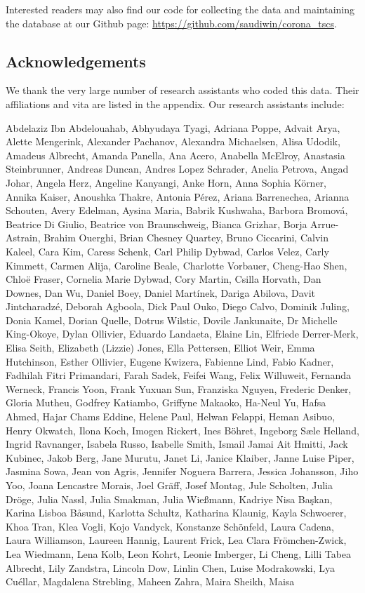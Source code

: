 \documentclass[]{article}
\begin{document}
Interested readers may also find our code for collecting the data and maintaining the database at our Github page: \url{https://github.com/saudiwin/corona_tscs}.

\hypertarget{acknowledgements}{%
\subsection*{Acknowledgements}\label{acknowledgements}}

We thank the very large number of research assistants who coded this data. Their affiliations and vita are listed in the appendix. Our research assistants include:

Abdelaziz Ibn Abdelouahab, Abhyudaya Tyagi, Adriana Poppe, Advait Arya, Alette Mengerink, Alexander Pachanov, Alexandra Michaelsen, Alisa Udodik, Amadeus Albrecht, Amanda Panella, Ana Acero, Anabella McElroy, Anastasia Steinbrunner, Andreas Duncan, Andres Lopez Schrader, Anelia Petrova, Angad Johar, Angela Herz, Angeline Kanyangi, Anke Horn, Anna Sophia Körner, Annika Kaiser, Anoushka Thakre, Antonia Pérez, Ariana Barrenechea, Arianna Schouten, Avery Edelman, Aysina Maria, Babrik Kushwaha, Barbora Bromová, Beatrice Di Giulio, Beatrice von Braunschweig, Bianca Grizhar, Borja Arrue-Astrain, Brahim Ouerghi, Brian Chesney Quartey, Bruno Ciccarini, Calvin Kaleel, Cara Kim, Caress Schenk, Carl Philip Dybwad, Carlos Velez, Carly Kimmett, Carmen Alija, Caroline Beale, Charlotte Vorbauer, Cheng-Hao Shen, Chloë Fraser, Cornelia Marie Dybwad, Cory Martin, Csilla Horvath, Dan Downes, Dan Wu, Daniel Boey, Daniel Martínek, Dariga Abilova, Davit Jintcharadzé, Deborah Agboola, Dick Paul Ouko, Diego Calvo, Dominik Juling, Donia Kamel, Dorian Quelle, Dotrus Wilstic, Dovile Jankunaite, Dr Michelle King-Okoye, Dylan Ollivier, Eduardo Landaeta, Elaine Lin, Elfriede Derrer-Merk, Elisa Seith, Elizabeth (Lizzie) Jones, Ella Pettersen, Elliot Weir, Emma Hutchinson, Esther Ollivier, Eugene Kwizera, Fabienne Lind, Fabio Kadner, Fadhilah Fitri Primandari, Farah Sadek, Feifei Wang, Felix Willuweit, Fernanda Werneck, Francis Yoon, Frank Yuxuan Sun, Franziska Nguyen, Frederic Denker, Gloria Mutheu, Godfrey Katiambo, Griffyne Makaoko, Ha-Neul Yu, Hafsa Ahmed, Hajar Chams Eddine, Helene Paul, Helwan Felappi, Heman Asibuo, Henry Okwatch, Ilona Koch, Imogen Rickert, Ines Böhret, Ingeborg Sæle Helland, Ingrid Ravnanger, Isabela Russo, Isabelle Smith, Ismail Jamai Ait Hmitti, Jack Kubinec, Jakob Berg, Jane Murutu, Janet Li, Janice Klaiber, Janne Luise Piper, Jasmina Sowa, Jean von Agris, Jennifer Noguera Barrera, Jessica Johansson, Jiho Yoo, Joana Lencastre Morais, Joel Gräff, Josef Montag, Jule Scholten, Julia Dröge, Julia Nassl, Julia Smakman, Julia Wießmann, Kadriye Nisa Başkan, Karina Lisboa Båsund, Karlotta Schultz, Katharina Klaunig, Kayla Schwoerer, Khoa Tran, Klea Vogli, Kojo Vandyck, Konstanze Schönfeld, Laura Cadena, Laura Williamson, Laureen Hannig, Laurent Frick, Lea Clara Frömchen-Zwick, Lea Wiedmann, Lena Kolb, Leon Kohrt, Leonie Imberger, Li Cheng, Lilli Tabea Albrecht, Lily Zandstra, Lincoln Dow, Linlin Chen, Luise Modrakowski, Lya Cuéllar, Magdalena Strebling, Maheen Zahra, Maira Sheikh, Maisa 
\end{document}
